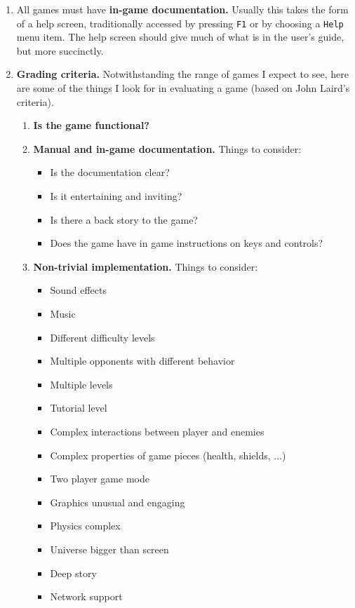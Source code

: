 \documentclass{article}
\begin{document}
\begin{enumerate}
\item All games must have {\bf in-game documentation.}  Usually this
takes the form of a help screen, traditionally accessed by pressing
{\tt F1} or by choosing a {\tt Help} menu item.  The help screen
should give much of what is in the user's guide, but more succinctly.

\newpage

\item{\bf  Grading criteria.}  Notwithstanding the range of games I expect to
see, here are some of the things I look for in evaluating a game
(based on John Laird's criteria).  
  \begin{enumerate}
\item{\bf Is the game functional? }
\item{\bf Manual and in-game documentation. }
      Things to consider:
      \begin{itemize}
  \item Is the  documentation clear?
     \item Is it entertaining and inviting?
     \item Is there a back story to the game?
     \item Does the game have in game instructions on keys and controls?
     \end{itemize}
  \item {\bf Non-trivial implementation. }
      Things to consider:
     \begin{itemize}
     \item Sound effects
     \item Music
     \item Different difficulty levels
     \item Multiple opponents with different behavior
     \item Multiple levels
     \item Tutorial level
     \item Complex interactions between player and enemies
     \item Complex properties of game pieces (health, shields, ...)
     \item Two player game mode
     \item Graphics unusual and engaging
     \item Physics complex
     \item Universe bigger than screen
     \item Deep story
     \item Network support

\end{itemize}
\end{enumerate}
\end{enumerate}
\end{document}
